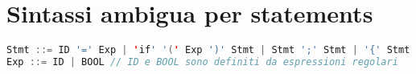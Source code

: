 \section{Sintassi ambigua per statements}
\begin{lstlisting}[language=Java, caption={Esempio di ambiguità per gli statements}]
Stmt ::= ID '=' Exp | 'if' '(' Exp ')' Stmt | Stmt ';' Stmt | '{' Stmt '}'
Exp ::= ID | BOOL // ID e BOOL sono definiti da espressioni regolari
\end{lstlisting}
